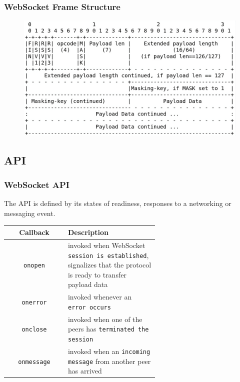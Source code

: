 \documentclass{beamer}
\begin{document}
\begin{frame}
    \frametitle{WebSocket Frame Structure}
    \begin{figure}
        \includegraphics[width=1\textwidth]{images/message_frame.png}
    \end{figure}
\end{frame}

\subsection{API}
\begin{frame}
    \frametitle{WebSocket API}
    The API is defined by its states of readiness, responses to a networking or messaging \alert{event}.
    \begin{table}
        \centering
        \begin{tabular}{|c | p{0.6\linewidth}|}
            \hline
            \textbf{Callback}  & \textbf{Description}                                                                                                   \\
            \hline
            \hline
            \texttt{onopen}    & invoked when WebSocket \texttt{session is established}, signalizes that the protocol is ready to transfer payload data \\
            \hline
            \texttt{onerror}   & invoked whenever an \texttt{error occurs}                                                                              \\
            \hline
            \texttt{onclose}   & invoked when one of the peers has \texttt{terminated the session}                                                      \\
            \hline
            \texttt{onmessage} & invoked when an \texttt{incoming message} from another peer has arrived                                                \\
            \hline
        \end{tabular}
    \end{table}
\end{frame}
\end{document}
